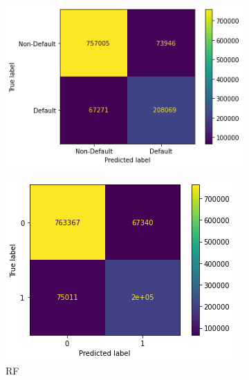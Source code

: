 \documentclass[twoside,11pt,a4paper]{article}
\begin{document}
\begin{figure}[h!]
	\begin{subfigure}{0.4 \textwidth}
		\includegraphics[width=1\linewidth, height=0.8\linewidth]{cm_svm}
		\label{fig:cm_svm}
	\end{subfigure}
	\hfill
	\begin{subfigure}{0.4 \textwidth}
		\includegraphics[width=1\linewidth, height=0.8\linewidth]{cm_rf}
		\caption[Random Forest]{\acs{RF}}
		\label{fig:cm_rf}
	\end{subfigure}
	\begin{subfigure}{0.4 \textwidth}

\end{subfigure}
\end{figure}
\end{document}
